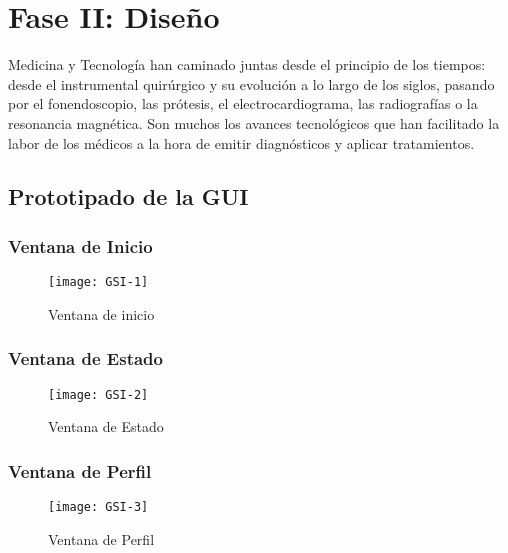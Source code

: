 \chapter {Fase II: Diseño}
\label{cap:Fase II.Diseño}

Medicina y Tecnología han caminado juntas desde el principio de los tiempos: desde el instrumental quirúrgico y su evolución a lo largo de los siglos, pasando por el fonendoscopio, las prótesis, el electrocardiograma, las radiografías o la resonancia magnética. Son muchos los avances tecnológicos que han facilitado la labor de los médicos a la hora de emitir diagnósticos y aplicar tratamientos.

\section{Prototipado de la GUI}
\subsection{Ventana de Inicio}
\begin{figure}[htb]
	\centering
	\texttt{[image: GSI-1]} 
	\caption[Ventana de Inicio]{Ventana de inicio}
	
	\label{fig:defInicio}
\end{figure}


\subsection{Ventana de Estado}
\begin{figure}[htb]
	\centering
	\texttt{[image: GSI-2]} 
	\caption[Ventana de Estado]{Ventana de Estado}
	
	\label{fig:defEstado}
\end{figure}

\subsection{Ventana de Perfil}
\begin{figure}[htb]
	\centering
	\texttt{[image: GSI-3]} 
	\caption[Ventana de Perfil]{Ventana de Perfil}
	
	\label{fig:defPerfil}
\end{figure}

